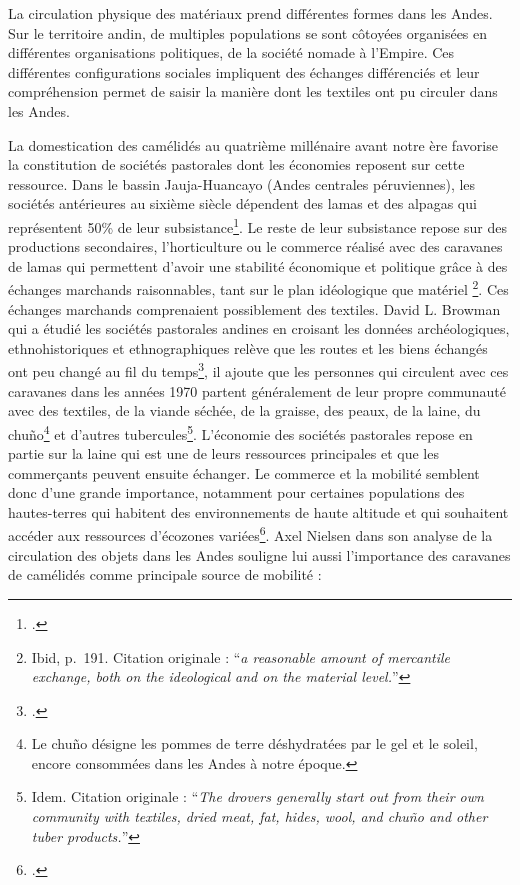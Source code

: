 La circulation physique des matériaux prend différentes formes dans les Andes. Sur le territoire andin, de multiples populations se sont côtoyées organisées en différentes organisations politiques, de la société nomade à l'Empire. Ces différentes configurations sociales impliquent des échanges différenciés et leur compréhension permet de saisir la manière dont les textiles ont pu circuler dans les Andes.

La domestication des camélidés au quatrième millénaire avant notre ère favorise la constitution de sociétés pastorales dont les économies reposent sur cette ressource. Dans le bassin Jauja-Huancayo (Andes centrales péruviennes), les sociétés antérieures au sixième siècle dépendent des lamas et des alpagas qui représentent 50\% de leur subsistance\footcite[p.~188]{browmanPastoralNomadismAndes1974}. 
Le reste de leur subsistance repose sur des productions secondaires, l'horticulture ou le commerce réalisé avec des caravanes de lamas qui permettent d'avoir une stabilité économique et politique grâce à \og  des échanges marchands raisonnables, tant sur le plan idéologique que matériel \fg\footnote{Ibid, p.~191. Citation originale : \textquotedblleft \textit{a reasonable amount of mercantile exchange, both on the ideological and on the material level.}\textquotedblright}. Ces échanges marchands comprenaient possiblement des textiles. David L. Browman qui a étudié les sociétés pastorales andines en croisant les données archéologiques, ethnohistoriques et ethnographiques relève que les routes et les biens échangés ont peu changé au fil du temps\footcite[p.~195]{browmanPastoralNomadismAndes1974}, il ajoute que les personnes qui circulent avec ces caravanes dans les années 1970 \og partent généralement de leur propre communauté avec des textiles, de la viande séchée, de la graisse, des peaux, de la laine, du chuño\footnote{Le chuño désigne les pommes de terre déshydratées par le gel et le soleil, encore consommées dans les Andes à notre époque.} et d'autres tubercules\fg\footnote{Idem. Citation originale : \textquotedblleft \textit{The drovers generally start out from their own community with textiles, dried meat, fat, hides, wool, and chuño and other tuber products.}\textquotedblright}. 
L'économie des sociétés pastorales repose en partie sur la laine qui est une de leurs ressources principales et que les commerçants peuvent ensuite échanger. Le commerce et la mobilité semblent donc d'une grande importance, notamment pour certaines populations des hautes-terres qui habitent des environnements de haute altitude et qui souhaitent accéder aux ressources d'écozones variées\footcite[p.~389]{nielsenCirculatingObjectsConstitution2013}. Axel Nielsen dans son analyse de la circulation des objets dans les Andes souligne lui aussi l'importance des caravanes de camélidés comme principale source de mobilité :  
